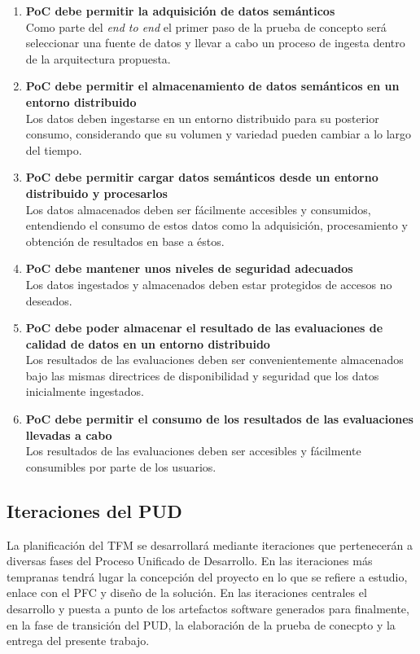 \begin{enumerate}
\item \textbf{PoC debe permitir la adquisición de datos semánticos}\\Como parte
  del \textit{end to end} el primer paso de la prueba de concepto será
  seleccionar una fuente de datos y llevar a cabo un proceso de ingesta dentro
  de la arquitectura propuesta. 
  
\item \textbf{PoC debe permitir el almacenamiento de datos semánticos en un
  entorno distribuido}\\Los datos deben ingestarse en un entorno distribuido
  para su posterior consumo, considerando que su volumen y variedad pueden
  cambiar a lo largo del tiempo. 
\item \textbf{PoC debe permitir cargar datos semánticos desde un entorno
  distribuido y procesarlos}\\Los datos almacenados deben ser fácilmente
  accesibles y consumidos, entendiendo el consumo de estos datos como la
  adquisición, procesamiento y obtención de resultados en base a éstos. 
\item \textbf{PoC debe mantener unos niveles de seguridad adecuados}\\Los datos
  ingestados y almacenados deben estar protegidos de accesos no deseados. 
\item \textbf{PoC debe poder almacenar el resultado de las evaluaciones de
  calidad de datos en un entorno distribuido}\\Los resultados de las
  evaluaciones deben ser convenientemente almacenados bajo las mismas
  directrices de disponibilidad y seguridad que los datos inicialmente ingestados.
\item \textbf{PoC debe permitir el consumo de los resultados de las evaluaciones
  llevadas a cabo}\\Los resultados de las evaluaciones deben ser accesibles y
  fácilmente consumibles por parte de los usuarios. 
\end{enumerate}


\subsection{Iteraciones del \acs{PUD}}

La planificación del \acs{TFM} se desarrollará mediante iteraciones que
pertenecerán a diversas fases del Proceso Unificado de Desarrollo. En las
iteraciones más tempranas tendrá lugar la concepción del proyecto en lo que se
refiere a estudio, enlace con el \acs{PFC} y diseño de la solución. En las
iteraciones centrales el desarrollo y puesta a punto de los artefactos software
generados para finalmente, en la fase de transición del \acs{PUD}, la
elaboración de la prueba de conecpto y la entrega del presente trabajo. 

